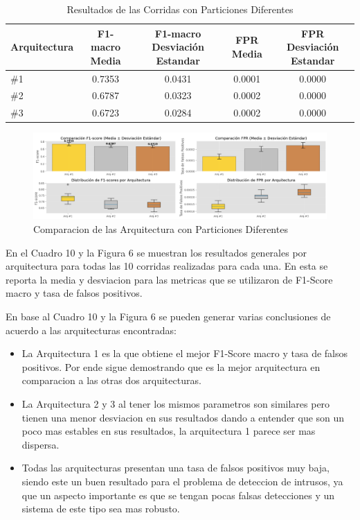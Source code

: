 \documentclass[12pt,a4paper]{article}
\begin{document}
\begin{table}[ht]
  \centering
  \tiny
  \begin{tabular}{lcccc}
    \hline
    Arquitectura & F1-macro Media & F1-macro Desviación Estandar & FPR Media & FPR Desviación Estandar \\
    \hline
    \#1 & 0.7353 & 0.0431 & 0.0001 & 0.0000 \\
    \#2 & 0.6787 & 0.0323 & 0.0002 & 0.0000 \\
    \#3 & 0.6723 & 0.0284 & 0.0002 & 0.0000 \\
    \hline
  \end{tabular}
  \caption{Resultados de las Corridas con Particiones Diferentes}
  \label{tab:corridas_part_dt}
\end{table}

\begin{figure}[H]
  \centering
  \includegraphics[width=1\textwidth]{../img/ComparacionPartArqui.png}
  \caption{Comparacion de las Arquitectura con Particiones Diferentes}\label{fig:partition-architectures-decision-tree}
\end{figure}

En el Cuadro 10 y la Figura 6 se muestran los resultados generales por arquitectura para todas las 10 corridas realizadas para cada una.
En esta se reporta la media y desviacion para las metricas que se utilizaron de F1-Score macro y tasa de falsos positivos.

En base al Cuadro 10 y la Figura 6 se pueden generar varias conclusiones de acuerdo a las arquitecturas encontradas:

\begin{itemize}
  \item La Arquitectura 1 es la que obtiene el mejor F1-Score macro y tasa de falsos positivos. Por ende
    sigue demostrando que es la mejor arquitectura en comparacion a las otras dos arquitecturas.
  \item La Arquitectura 2 y 3 al tener los mismos parametros son similares pero tienen una menor desviacion en sus resultados
    dando a entender que son un poco mas estables en sus resultados, la arquitectura 1 parece ser mas dispersa.
  \item Todas las arquitecturas presentan una tasa de falsos positivos muy baja, siendo este un buen resultado
    para el problema de deteccion de intrusos, ya que un aspecto importante es que se tengan pocas falsas detecciones
    y un sistema de este tipo sea mas robusto.
\end{itemize}
\end{document}

